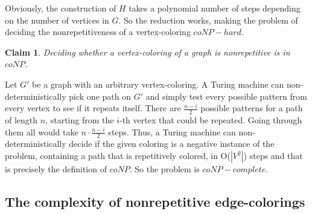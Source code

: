 \documentclass[12pt,a4paper]{article}
\newtheorem{claim}{Claim}
\begin{document}
\newline
Obviously, the construction of $H$ takes a polynomial number of steps depending on the number of vertices in $G$. So the reduction works, making the problem of deciding the nonrepetitiveness of a vertex-coloring $coNP-hard$. 
\begin{claim}
Deciding whether a vertex-coloring of a graph is nonrepetitive is in $coNP$.
\end{claim} 
Let $G'$ be a graph with an arbitrary vertex-coloring. A Turing machine can non-deterministically pick one path on $G'$ and simply test every possible pattern from every vertex to see if it repeats itself. There are $\frac{n - i}{2}$ possible patterns for a path of length $n$, starting from the $i$-th vertex that could be repeated. Going through them all would take $n \cdot \frac{n - i}{2}$ steps. Thus, a Turing machine can non-deterministically decide if the given coloring is a negative instance of the problem, containing a path that is repetitively colored,  in O($|V^2|$) steps and that is precisely the definition of $coNP$. 
\newline
So the problem is $coNP-complete$.
\newpage

\subsection{The complexity of nonrepetitive edge-colorings}
\end{document}
